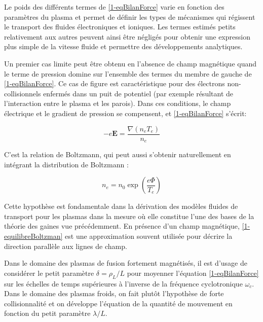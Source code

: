 \begin{refsection}
Le poids des différents termes de \eqref{1-eqBilanForce} varie en fonction des
paramètres du plasma et permet de définir les types de mécanismes qui régissent
le transport des fluides électroniques et ioniques. Les termes estimés petits
relativement aux autres peuvent ainsi être négligés pour obtenir une
expression plus simple de la vitesse fluide et permettre des développements
analytiques.

Un premier cas limite peut être obtenu en l'absence de champ magnétique quand
le terme de pression domine sur l'ensemble des termes du membre de gauche de
\eqref{1-eqBilanForce}. Ce cas de figure est caractéristique pour des électrons
non-collisionnels enfermés dans un puit de potentiel (par exemple résultant de
l'interaction entre le plasma et les parois). Dans ces conditions, le champ électrique et le gradient
de pression se compensent, et \eqref{1-eqBilanForce} s'écrit:

\begin{equation}
\label{1-equilibreBoltzman}
-e\mathbf
E =\frac{\nabla (n_e T_e)}{n_e}
\end{equation}

C'est la relation de Boltzmann, qui peut aussi s'obtenir naturellement en
intégrant la distribution de Boltzmann :

\begin{equation}
\label{1-profilBoltzman}
n_e=n_0\exp(\frac{e\Phi}{T_e})
\end{equation}

Cette hypothèse est fondamentale dans la dérivation des modèles fluides
de transport pour les plasmas dans la mesure où elle constitue l'une des bases
de la théorie des gaines vue précédemment.
En présence d'un champ magnétique,
\eqref{1-equilibreBoltzman} est une approximation souvent utilisée pour
décrire la direction parallèle aux lignes de champ. 

Dans le domaine des plasmas de fusion fortement magnétisés, il est
d'usage de considérer le petit paramètre $\delta=\rho_L/L$ pour moyenner
l'équation \eqref{1-eqBilanForce} sur les échelles de temps supérieures à
l'inverse de la fréquence cyclotronique $\omega_{c}$.
Dans le domaine des plasmas
froids, on fait plutôt l'hypothèse de forte collisionnalité et on développe
l'équation de la quantité de mouvement en fonction du petit paramètre
$\lambda/L$.


\end{refsection}
